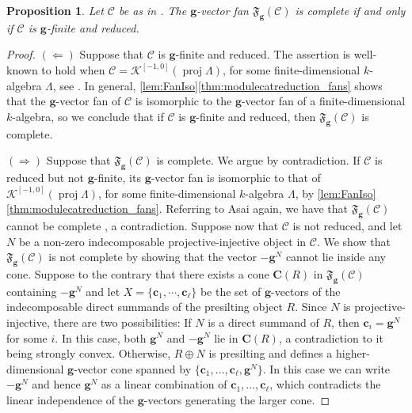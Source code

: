 \documentclass[10pt,twoside, a4paper,reqno]{amsart}
\DeclareMathOperator{\proj}{proj}
\newcommand{\Ktwo}{\mathcal{K}^{[-1,0]}}
\newcommand{\partfan}[1]{\mathfrak{F}_{\bfg}(#1)}
\newcommand{\calC}{\mathcal{C}}
\newcommand{\boldC}{\mathbf{C}}
\newcommand{\bfg}{\mathbf{g}}
\newtheorem{proposition}[theorem]{Proposition}
\theoremstyle{definition}
\begin{document}
\begin{proposition}\label{prop:Asa21.4.7}
Let $\calC$ be as in .
The $\bfg$-vector fan $\partfan{\calC}$ is complete if and only if $\calC$ is $\bfg$-finite and reduced. 
\end{proposition}
 \begin{proof}
    $(\Leftarrow)$ Suppose that $\calC$ is {$\bfg$-finite and} reduced. 
    The assertion is well-known to hold when $\calC = \Ktwo(\proj \Lambda)$, for some finite-dimensional $k$-algebra $\Lambda${, see} \cite[{Thm.} 4.7]{Asa21}.
    In general, \cref{lem:FanIso}\eqref{thm:modulecatreduction_fans} shows that the $\bfg$-vector fan of $\calC$ is isomorphic to the $\bfg$-vector fan of a finite-dimensional $k$-algebra, so we conclude that if $\calC$ is $\bfg$-finite and reduced, then $\partfan{\calC}$ is complete. 
     
    $(\Rightarrow)$ Suppose that $\partfan{\calC}$ is complete. We argue by contradiction. If $\calC$ is reduced but not $\bfg$-finite, its $\bfg$-vector fan is isomorphic to that of $\Ktwo(\proj \Lambda)$, for some finite-dimensional $k$-algebra $\Lambda$, by \cref{lem:FanIso}\eqref{thm:modulecatreduction_fans}. Referring to Asai again, we have that $\partfan{\calC}$ cannot be complete \cite[Thm. 4.7]{Asa21}, a contradiction.
    Suppose now that $\calC$ is not reduced, and let $N$ be a non-zero indecomposable projective-injective object in $\calC$. We show that $\partfan{\calC}$ is not complete by showing that the vector $-\bfg^{N}$ cannot lie inside any cone. Suppose to the contrary that there exists a cone $\mathbf{C}{(R)}$ in $\partfan{\calC}$ containing $-\bfg^{N}$ and let $X=\{\mathbf{c}_1, \cdots ,\mathbf{c}_{\ell} \}$ be the set of $\bfg$-vectors {of the indecomposable direct summands of the presilting object $R$}. Since ${N}$ is projective-injective, there are two possibilities:  If $N$ is a direct summand of $R$, then $\mathbf{c}_i=\bfg^{{N}}$ for some $i$. In this case, both $\bfg^N$ and $-\bfg^N$ lie in $\boldC(R)$, a contradiction to it being strongly convex. Otherwise, $R \oplus N$ is presilting and defines a higher-dimensional $\bfg$-vector cone spanned by $\{ \mathbf{c}_1, \dots, \mathbf{c}_{\ell}, \bfg^{{N}}\}$. In this case we can write $- \bfg^N$ and hence $\bfg^N$ as a linear combination of $\mathbf{c}_1, \dots, \mathbf{c}_{\ell}$, which contradicts the linear independence of the $\bfg$-vectors generating the larger cone.
	 \end{proof}
\end{document}
